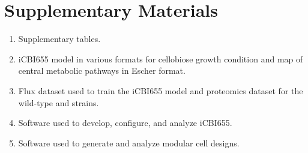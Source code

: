 \section*{Supplementary Materials}
\begin{enumerate}
    \item Supplementary tables. \label{sm:figures}
    \item iCBI655 model in various formats for cellobiose growth condition and map of central metabolic pathways in Escher format. \label{sm:model}
    \item Flux dataset used to train the iCBI655 model and proteomics dataset for the wild-type and  strains. \label{sm:datasets}
    \item Software used to develop, configure, and analyze iCBI655. \label{sm:code}
    \item Software used to generate and analyze modular cell designs. \label{sm:modcell}
\end{enumerate}


